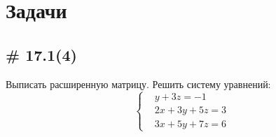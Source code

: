 \documentclass[a4paper,12pt]{article}
\begin{document}
  
  
  \section{Задачи}
  
  \subsection{\# 17.1(4)}
  
  Выписать расширенную матрицу.
  Решить систему уравнений:
  \[
    \left\{
    \begin{aligned}
      &y + 3z = -1\\
      &2x + 3y + 5z = 3\\
      &3x + 5y + 7z = 6
    \end{aligned}
    \right.
  \]
  
\end{document}
